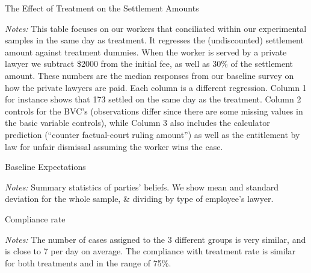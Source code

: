 \documentclass[9pt]{beamer}
\begin{document}
\begin{frame}{The Effect of Treatment on the Settlement Amounts}
\begin{table}[H]
    \label{SS_OC}
    \begin{center}
       \scriptsize{}
    \end{center}
\end{table}
\footnotesize
\textit{Notes:}
This table focuses on our workers that conciliated within our experimental samples in the same day as treatment. It regresses the (undiscounted) settlement amount against treatment dummies. When the worker is served by a private lawyer we subtract \$2000 from the initial fee, as well as 30\% of the settlement amount. These numbers are the median responses from our baseline survey on how the private lawyers are paid. Each column is a different regression. Column 1 for instance shows that 173 settled on the same day as the treatment. Column 2 controls for the BVC's (observations differ since there are some missing values in the basic variable controls), while Column 3 also includes the calculator prediction (``counter factual-court ruling amount'') as well as the entitlement by law for unfair dismissal assuming the worker wins the case.
\end{frame}



\begin{frame}{Baseline Expectations}
\begin{table}[H]
    \label{Table_expectations}
    \begin{center}
       \scriptsize{}
    \end{center}
\end{table}
    \footnotesize    
    \textit{Notes:} 
    Summary statistics of parties' beliefs. We show mean and standard deviation for the whole sample, \& dividing by type of employee's lawyer.
\end{frame}



\begin{frame}{Compliance rate}
 \begin{table}[H]
  \resizebox{0.9\textwidth}{!}{\begin{minipage}{\textwidth}
\label{Table_compliance}
\begin{center}
\scriptsize{}
\end{center}
\end{minipage}}
\end{table}
 \footnotesize
\textit{Notes:} 
The number of cases assigned to the 3 different groups is very similar, and is close to 7 per day on average. The compliance with treatment rate is similar for both treatments and in the range of 75\%.
\end{frame}
\end{document}
